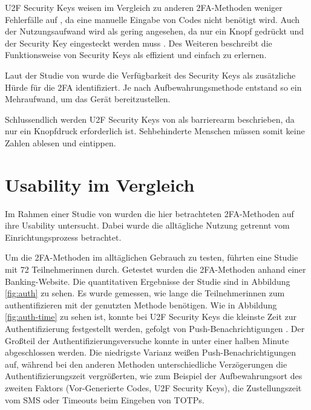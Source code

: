 \ac{U2F} Security Keys weisen im Vergleich zu anderen \ac{2FA}-Methoden weniger Fehlerfälle auf \parencite{langSecurityKeys2017}, da eine manuelle Eingabe von Codes nicht benötigt wird. Auch der Nutzungsaufwand wird als gering angesehen, da nur ein Knopf gedrückt und der Security Key eingesteckt werden muss \parencite{langSecurityKeys2017}. Des Weiteren beschreibt \textcite{langSecurityKeys2017} die Funktionsweise von Security Keys als effizient und einfach zu erlernen.

Laut der Studie von \textcite{reeseUsabilityStudy2019} wurde die Verfügbarkeit des Security Keys als zusätzliche Hürde für die \ac{2FA} identifiziert. Je nach Aufbewahrungsmethode entstand so ein Mehraufwand, um das Gerät bereitzustellen.

Schlussendlich werden \ac{U2F} Security Keys von \textcite{langSecurityKeys2017} als barrierearm beschrieben, da nur ein Knopfdruck erforderlich ist. Sehbehinderte Menschen müssen somit keine Zahlen ablesen und eintippen.

\section{Usability im Vergleich}

Im Rahmen einer Studie von \textcite{reeseUsabilityStudy2019} wurden die hier betrachteten \ac{2FA}-Methoden auf ihre Usability untersucht. Dabei wurde die alltägliche Nutzung getrennt vom Einrichtungsprozess betrachtet.

Um die \ac{2FA}-Methoden im alltäglichen Gebrauch zu testen, führten \textcite{reeseUsabilityStudy2019} eine Studie mit 72 Teilnehmerinnen durch. Getestet wurden die \ac{2FA}-Methoden anhand einer Banking-Website. Die quantitativen Ergebnisse der Studie sind in Abbildung \ref{fig:auth} zu sehen. Es wurde gemessen, wie lange die Teilnehmerinnen zum authentifizieren mit der genutzten Methode benötigen. Wie in Abbildung \ref{fig:auth-time} zu sehen ist, konnte bei \ac{U2F} Security Keys die kleinste Zeit zur Authentifizierung festgestellt werden, gefolgt von Push-Benachrichtigungen \parencite{reeseUsabilityStudy2019}. Der Großteil der Authentifizierungsversuche konnte in unter einer halben Minute abgeschlossen werden. Die niedrigste Varianz weißen Push-Benachrichtigungen auf, während bei den anderen Methoden unterschiedliche Verzögerungen die Authentifizierungszeit vergrößerten, wie zum Beispiel der Aufbewahrungsort des zweiten Faktors (Vor-Generierte Codes, \ac{U2F} Security Keys), die Zustellungszeit vom SMS oder Timeouts beim Eingeben von \acp{TOTP}.

